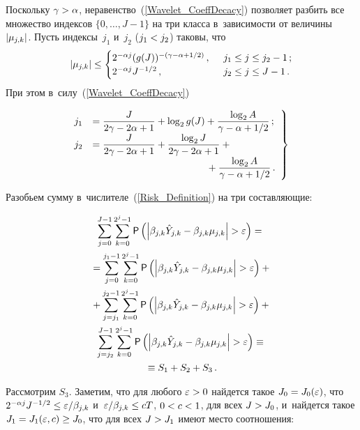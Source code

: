 \begin{multicols}{2}
Поскольку $\gamma\hm>\alpha$, неравенство~(\ref{Wavelet_CoeffDecacy}) 
поз\-во\-ля\-ет разбить все множество индексов $\{0,\ldots,J-1\}$ 
на три класса в~за\-ви\-си\-мости от величины~$|\mu_{j,k}|$. Пусть индексы~$j_1$ и~$j_2$ 
($j_1\hm< j_2$) таковы, что
\begin{equation*}
\left\vert \mu_{j,k}\right\vert \leq 
\begin{cases}
2^{-\alpha j}(g(J))^{-(\gamma-\alpha+1/2)}\,,&\enskip
j_1\leq j\leq j_2-1\,;\\
 2^{-\alpha j}J^{-1/2}\,, &\enskip
 j_2\leq j \leq J-1\,.
 \end{cases}
 \end{equation*}
При этом в~силу~(\ref{Wavelet_CoeffDecacy})

\noindent
\begin{equation} %
\left.
\begin{array}{rl}
\hspace*{-2mm}j_1&=\fr{J}{2\gamma-2\alpha+1}+\log_2 g(J)+ \fr{\log_2 A}{\gamma-\alpha+1/2}\,;
\\[6pt]
\hspace*{-2mm}j_2&=\fr{J}{2\gamma-2\alpha+1}+\fr{\log_2 J}{2\gamma-2\alpha+1}+{}\\[6pt]
&\hspace*{41mm}{}+ \fr{\log_2 A}{\gamma-\alpha+1/2}\,.
\end{array}
\right\}
\label{Indices_Soft_j2}
\end{equation}

Разобьем сумму в~чис\-ли\-те\-ле~(\ref{Risk_Definition}) на три со\-став\-ля\-ющие:

\noindent
\begin{multline}
\sum\limits_{j=0}^{J-1}\sumk{\sf P}
\left(\left|\betajk\hat{Y}_{j,k}-\betajk\mujk\right|>\varepsilon\right)={}\\
{}=
\sum\limits_{j=0}^{j_1-1}\sumk{\sf P}
\left(\left|\betajk\hat{Y}_{j,k}-\betajk\mujk\right|>\varepsilon\right)+{}\\
{}+\sum\limits_{j=j_1}^{j_2-1}\sumk{\sf P}
\left(\left|\betajk\hat{Y}_{j,k}-\betajk\mujk\right|>\varepsilon\right)+{}\\
{}\sum\limits_{j=j_2}^{J-1}\sumk{\sf P}
\left(\left|\betajk\hat{Y}_{j,k}-\betajk\mujk\right|>\varepsilon\right)\equiv{}\\ 
{}\equiv S_1+S_2+S_3\,.
\label{Risk_Decomposition}
\end{multline}

Рассмотрим $S_3$. Заметим, что для любого $\varepsilon\hm>0$ найдется такое 
$J_0\hm=J_0(\varepsilon)$, что 
$2^{-\alpha j}J^{-1/2}\hm\leq\varepsilon/\betajk$ и~$\varepsilon/\betajk\hm\leq cT$, 
$0\hm<c\hm<1$, для всех $J\hm>J_0$, и~найдется такое $J_1\hm=J_1(\varepsilon,c)
\hm\geq J_0$, что для всех $J\hm>J_1$ имеют место соотношения:


\end{multicols}
